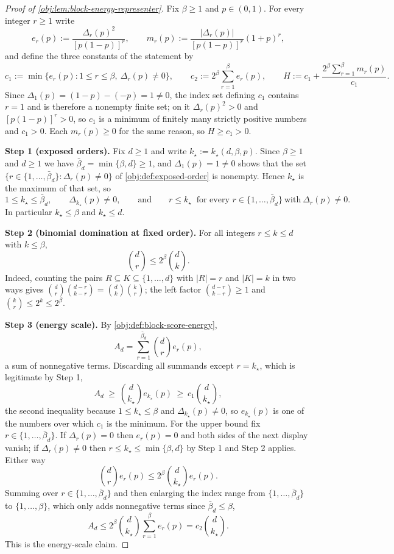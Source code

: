 \documentclass[11pt]{article}
\begin{document}
\begin{proof}[Proof of \cref{obj:lem:block-energy-representer}]
Fix \(\beta\ge1\) and \(p\in(0,1)\).  For every integer \(r\ge1\) write
\[
e_r(p):=\frac{\Delta_r(p)^2}{[p(1-p)]^r},
\qquad
m_r(p):=\frac{|\Delta_r(p)|}{[p(1-p)]^r}(1+p)^r ,
\]
and define the three constants of the statement by
\[
c_1:=\min\bigl\{e_r(p):1\le r\le\beta,\ \Delta_r(p)\ne0\bigr\},
\qquad
c_2:=2^\beta\sum_{r=1}^{\beta}e_r(p),
\qquad
H:=c_1+\frac{2^\beta\sum_{r=1}^{\beta}m_r(p)}{c_1}.
\]
Since \(\Delta_1(p)=(1-p)-(-p)=1\ne0\), the index set defining \(c_1\) contains \(r=1\) and is therefore a nonempty finite set; on it \(\Delta_r(p)^2>0\) and \([p(1-p)]^r>0\), so \(c_1\) is a minimum of finitely many strictly positive numbers and \(c_1>0\).  Each \(m_r(p)\ge0\) for the same reason, so \(H\ge c_1>0\). %

\textbf{Step 1 (exposed orders).}
Fix \(d\ge1\) and write \(k_\star:=k_\star(d,\beta,p)\).  Since \(\beta\ge1\) and \(d\ge1\) we have \(\bar\beta_d=\min\{\beta,d\}\ge1\), and \(\Delta_1(p)=1\ne0\) shows that the set \(\{r\in\{1,\ldots,\bar\beta_d\}:\Delta_r(p)\ne0\}\) of \cref{obj:def:exposed-order} is nonempty.  Hence \(k_\star\) is the maximum of that set, so
\[
1\le k_\star\le\bar\beta_d,
\qquad
\Delta_{k_\star}(p)\ne0,
\qquad\text{and}\qquad
r\le k_\star
\ \text{ for every } r\in\{1,\ldots,\bar\beta_d\}\ \text{with}\ \Delta_r(p)\ne0 .
\]
In particular \(k_\star\le\beta\) and \(k_\star\le d\). %

\textbf{Step 2 (binomial domination at fixed order).}
For all integers \(r\le k\le d\) with \(k\le\beta\),
\[
\binom d r\le 2^\beta\binom d k .
\]
Indeed, counting the pairs \(R\subseteq K\subseteq\{1,\ldots,d\}\) with \(|R|=r\) and \(|K|=k\) in two ways gives \(\binom d r\binom{d-r}{k-r}=\binom d k\binom k r\); the left factor \(\binom{d-r}{k-r}\ge1\) and \(\binom k r\le 2^k\le2^\beta\). %

\textbf{Step 3 (energy scale).}
By \cref{obj:def:block-score-energy},
\[
A_d=\sum_{r=1}^{\bar\beta_d}\binom d r e_r(p),
\]
a sum of nonnegative terms.  Discarding all summands except \(r=k_\star\), which is legitimate by Step 1,
\[
A_d\ \ge\ \binom{d}{k_\star}e_{k_\star}(p)\ \ge\ c_1\binom{d}{k_\star},
\]
the second inequality because \(1\le k_\star\le\beta\) and \(\Delta_{k_\star}(p)\ne0\), so \(e_{k_\star}(p)\) is one of the numbers over which \(c_1\) is the minimum.  For the upper bound fix \(r\in\{1,\ldots,\bar\beta_d\}\).  If \(\Delta_r(p)=0\) then \(e_r(p)=0\) and both sides of the next display vanish; if \(\Delta_r(p)\ne0\) then \(r\le k_\star\le\min\{\beta,d\}\) by Step 1 and Step 2 applies.  Either way
\[
\binom d r e_r(p)\le 2^\beta\binom{d}{k_\star}e_r(p).
\]
Summing over \(r\in\{1,\ldots,\bar\beta_d\}\) and then enlarging the index range from \(\{1,\ldots,\bar\beta_d\}\) to \(\{1,\ldots,\beta\}\), which only adds nonnegative terms since \(\bar\beta_d\le\beta\),
\[
A_d\le 2^\beta\binom{d}{k_\star}\sum_{r=1}^{\beta}e_r(p)=c_2\binom{d}{k_\star}.
\]
This is the energy-scale claim. %


\end{proof}
\end{document}

